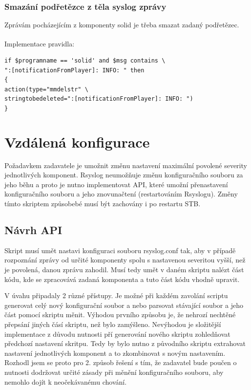 \documentclass[thesis=B,czech]{FITthesis}[2012/06/26]
\begin{document}
\subsubsection{Smazání podřetězce z těla syslog zprávy}
Zprávám pocházejícím z komponenty solid je třeba smazat zadaný podřetězec.
\\
\\
Implementace pravidla:
\begin{lstlisting}
if $programname == 'solid' and $msg contains \
":[notificationFromPlayer]: INFO: " then
{
action(type="mmdelstr" \ 
stringtobedeleted=":[notificationFromPlayer]: INFO: ")
}
\end{lstlisting}


\section{Vzdálená konfigurace}
Požadavkem zadavatele je umožnit změnu nastavení maximální povolené severity jednotlivých komponent. Rsyslog neumožňuje změnu konfiguračního souboru za jeho běhu a proto je nutno implementovat API, které umožní přenastavení konfiguračního souboru a jeho znovunačtení (restartováním Rsyslogu).
Změny tímto skriptem způsobebé musí být zachovány i po restartu STB.

\subsection{Návrh API}
Skript musí umět nastavi konfiguraci souboru rsyslog.conf tak, aby v případě rozpoznání zprávy od určité komponenty spolu s nastavenou severitou vyšší, než je povolená, danou zprávu zahodil. 
Musí tedy umět v daném skriptu nalézt část kódu, kde se zpracovává zadaná komponenta a tuto část kódu vhodně upravit.

V úvahu připadaly 2 různé přístupy. Je možné při každém zavolání scriptu generovat celý nový konfigurační soubor a nebo parsovat stávající soubor a jeho část pomocí skriptu měnit.
Výhodou prvního způsobu je, že nehrozí nechtěné přepsání jiných čásí skriptu, než bylo zamýšleno. Nevýhodou je složitější implementace z důvodu nutnosti pří generování nového skriptu zohledňovat předchozí nastavení skritpu. Tedy by bylo nutno z původního skriptu extrahovat nastavení jednotlivých komponent a to zkombinovat s novým nastavením.
Rozhodl jsem se proto pro 2. způsob řešení s tím, že zadavatel bude poučen o nutnosti dodržovat určité zásady při měnění konfiguračního souboru, aby nemohlo dojít k neočekávanému chování.
\end{document}

